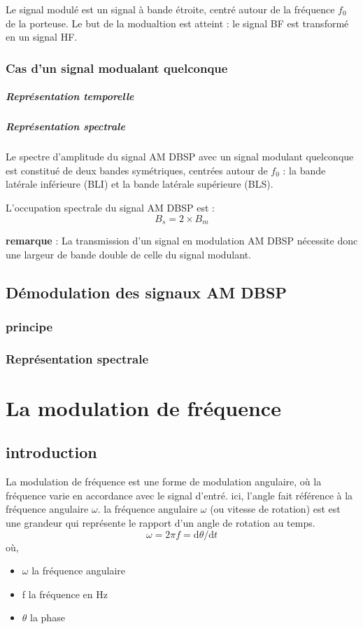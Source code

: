 \documentclass[12pt,a4paper,hidelinks,oneside]{book}
\begin{document}
Le signal modulé est un signal à bande étroite, centré autour de la fréquence $f_{0}$ de la porteuse. Le but
de la modualtion est atteint : le signal BF est transformé en un signal HF.

\subsection{Cas d’un signal modualant quelconque}
\paragraph{Représentation temporelle}
\paragraph{Représentation spectrale }
Le spectre d’amplitude du signal AM DBSP avec un signal modulant quelconque est constitué de deux
bandes symétriques, centrées autour de $f_{0}$ : la bande latérale inférieure (BLI) et la bande latérale
supérieure (BLS).

L’occupation spectrale du signal AM DBSP est :
\begin{equation}
B_{s}=2\times B_{m}
\end{equation}

\noindent\textbf{remarque} : La transmission d’un signal en modulation AM DBSP nécessite donc une largeur de bande double de
celle du signal modulant.

\section{Démodulation des signaux AM DBSP}
\subsection{principe}
\subsection{Représentation spectrale}


\chapter{La modulation de fréquence} 
\section{introduction}
La modulation de fréquence est une forme de modulation angulaire, où la fréquence
varie en accordance avec le signal d'entré. ici, l'angle fait référence à la fréquence
angulaire $\omega$. la fréquence angulaire $\omega$ (ou vitesse de rotation) est est une grandeur qui représente
le rapport d'un angle de rotation au temps.
\begin{equation}
\omega=2 \pi f=\mathrm{d} \theta / \mathrm{d} t \label{3.1}
\end{equation}
où,
\begin{itemize}
	\item $\omega$ la fréquence angulaire
	\item f la fréquence en \si{\hertz}
	\item $\theta$ la phase 
\end{itemize}
\end{document}
